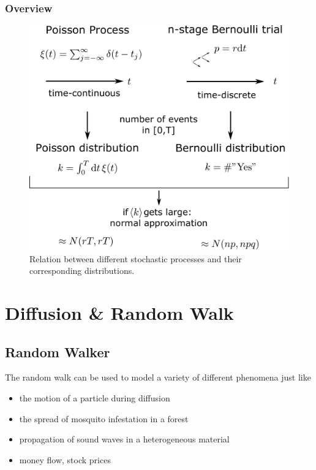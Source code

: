 \documentclass{notebook}
\begin{document}
\subsection*{Overview}

\begin{figure}[H]
	\centering
	\includegraphics[width=0.9\linewidth]{Pics/overview_stochastic_processes}
	\caption{Relation between different stochastic processes and their corresponding distributions.}
	\label{fig:overviewstochasticprocesses}
\end{figure}


\chapter{Diffusion \& Random Walk}

\section{Random Walker}

The random walk can be used to model a variety of different phenomena just like
%
\begin{itemize}
	\item{the motion of a particle during diffusion}
	\item{the spread of mosquito infestation in a forest}
	\item{propagation of sound waves in a heterogeneous material}
	\item{money flow, stock prices}
\end{itemize}
%
\end{document}
